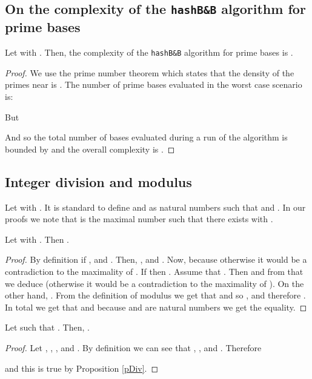 \documentclass[envcountsame]{llncs}
\begin{document}
\subsection{On the complexity of the \texttt{hashB\&B} algorithm
  for prime bases}

\begin{theorem}
  Let   with  . Then,
  the complexity of the \texttt{hashB\&B} algorithm for prime bases
  is .
\end{theorem}

\begin{proof}
  We use the prime number theorem which states that the density of the
  primes near  is .
  The number of prime bases evaluated in the worst case scenario is: 
  
  But 
  
And so the total number of bases evaluated during a run of the
algorithm is bounded by  and the overall
complexity is .
\end{proof}\bigskip


\subsection{Integer division and modulus}
\noindent
Let  with . It is standard to define
 and  as natural numbers such that  and . In our proofs we note
that  is the maximal number such that there exists  with .






\begin{proposition}
\label{pDiv} 
Let   with . Then .
\end{proposition}

 \begin{proof}
   By definition if ,  and
   . Then, , 
   and . Now,  because
   otherwise it would be a contradiction to the maximality of .  If
    then .  Assume that . Then  and from that we
   deduce  (otherwise it would be a contradiction to the
   maximality of ).  On the other hand,   . 
From the definition of modulus
we get that  and so , and therefore .  In total we get that  and because  and  are natural numbers we get the
   equality.
 \end{proof}\bigskip


\begin{proposition} 
  \label{pDivMod}
  Let  such that . Then, .
\end{proposition}

\begin{proof}
  Let , , , and
  . By definition we can see that , , and . Therefore
   
              
  and this is true by Proposition \ref{pDiv}.
\end{proof}\bigskip
\end{document}
